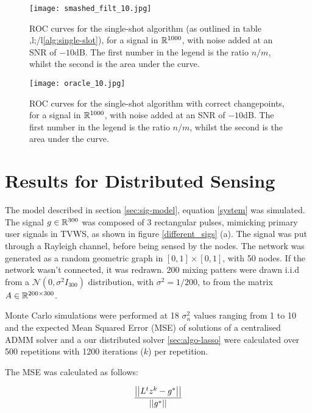 \begin{figure}[h]
\centering
\texttt{[image: smashed\_filt\_10.jpg]}
\caption{ROC curves for the single-shot algorithm (as outlined in table ,l;/l\ref{alg:single-slot}), for a signal in \({\mathbb{R}}^{1000}\), with noise added at an SNR of \(-10\)dB. The first number in the legend is the ratio \(n/m\), whilst the second is the area under the curve.}
\label{oracle-compare}
\end{figure}

\begin{figure}[h]
\centering
\texttt{[image: oracle\_10.jpg]}
\caption{ROC curves for the single-shot algorithm with correct changepoints, for a signal in \({\mathbb{R}}^{1000}\), with noise added at an SNR of \(-10\)dB. The first number in the legend is the ratio \(n/m\), whilst the second is the area under the curve.}
\label{oracle}
\end{figure}

\clearpage

\section{Results for Distributed Sensing}
\label{sec:dist-results}
The model described in section \eqref{sec:sig-model}, equation \eqref{system} was simulated. The signal \(g \in {\mathbb{R}}^{300} \) was composed of 3 rectangular pulses, mimicking primary user signals in TVWS, as shown in figure \eqref{different_sigs} (a). The signal was put through a Rayleigh channel, before being sensed by the nodes. The network was generated as a random geometric graph in \([0,1] \times [0,1]\), with 50 nodes. If the network wasn't connected, it was redrawn. 200 mixing patters were drawn i.i.d from a \(\mathcal{N}\left(0, \sigma^2 I_{300} \right) \) distribution, with \(\sigma^2 = 1/200\), to from the matrix \(A\in  {\mathbb{R}}^{200 \times 300}\).

Monte Carlo simulations were performed at 18 \(\sigma^2_n\) values ranging from 1 to 10 and the expected Mean Squared Error (MSE) of solutions of a centralised ADMM solver and a our distributed solver \ref{sec:algo-lasso} were calculated over 500 repetitions with 1200 iterations (\(k\)) per repetition.

The MSE was calculated as follows:

\begin{equation}
\frac{\left|\left|L^tz^k - g^*\right|\right|}{\left|\left|g^*\right|\right|}
\end{equation}

